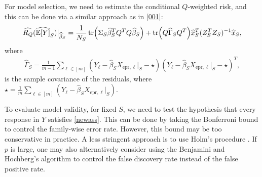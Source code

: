 \documentclass[11pt,a4paper]{amsart}
\numberwithin{equation}{section}
\theoremstyle{plain}
\theoremstyle{definition}
\def\E{{\mathbb E}}
\def\ex{{\text{epr}}}
\begin{document}
For model selection, we need to estimate the conditional $Q$-weighted risk, and this can be done via a similar approach as in \eqref{001}: 
\begin{align}
\widehat{R_Q}(\widehat{\E[Y]}_S)|_{\widehat{\beta}_S} = \frac{1}{N_S}\tr(\Sigma_S\widehat{\beta}_S^TQ^TQ\widehat{\beta}_S) + \tr(Q\widehat{\Gamma}_SQ^T)\widehat{x}_S^T(Z_S^TZ_S)^{-1}\widehat{x}_S,\label{kl}
\end{align}
where 
\begin{align}
\widehat{\Gamma}_S = \frac{1}{m-1}\sum_{\ell\in [m]}\left(Y_\ell - \widehat{\beta}_SX_{\ex,\ell}|_S -\star\right)\left(Y_\ell - \widehat{\beta}_SX_{\ex,\ell}|_S -\star\right)^T, \label{rep-noise}
\end{align}
is the sample covariance of the residuals, where $\star = \frac{1}{m}\sum_{\ell\in [m]}(Y_\ell - \widehat{\beta}_SX_{\ex,\ell}|_S)$.

To evaluate model validity, for fixed $S$, we need to test the hypothesis that every response in $Y$ satisfies \eqref{newass}.  This can be done by taking the Bonferroni bound to control the family-wise error rate. 
However, this bound may be too conservative in practice. A less stringent approach is to use Holm's procedure \cite{holm1979simple}. If $p$ is large, one may also alternatively consider using the Benjamini and Hochberg's algorithm \cite{Benjamini_1995} to control the false discovery rate instead of the false positive rate. 
\end{document}

